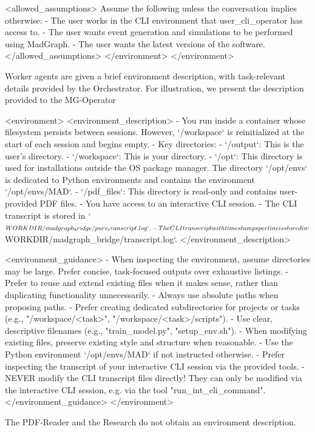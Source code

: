 \documentclass[submission, Phys]{SciPost}
\begin{document}
\begin{promptblocklit}
<allowed_assumptions>
Assume the following unless the conversation implies otherwise:
- The user works in the CLI environment that user_cli_operator has access to.
- The user wants event generation and simulations to be performed using MadGraph.
- The user wants the latest versions of the software.
</allowed_assumptions>
</environment>
</environment>
\end{promptblocklit}
%

Worker agents are given a brief environment description, with task-relevant details provided by the Orchestrator. For illustration, we present the description provided to the MG-Operator
\begin{promptblocklit}
<environment>
<environment_description>
- You run inside a container whose filesystem persists between sessions. However, `/workspace` is reinitialized at the start of each session and begins empty.
- Key directories:
  - `/output`: This is the user's directory.
  - `/workspace`: This is your directory.
  - `/opt`: This directory is used for installations outside the OS package manager. The directory `/opt/envs` is dedicated to Python environments and contains the environment `/opt/envs/MAD`.
  - `/pdf_files`: This directory is read-only and contains user-provided PDF files.
- You have access to an interactive CLI session.
  - The CLI transcript is stored in `$WORKDIR/madgraph_bridge/pure_transcript.log`.
  - The CLI transcript with timestamps per line is stored in `$WORKDIR/madgraph_bridge/transcript.log`.
</environment_description>

<environment_guidance>
- When inspecting the environment, assume directories may be large. Prefer concise, task-focused outputs over exhaustive listings.
- Prefer to reuse and extend existing files when it makes sense, rather than duplicating functionality unnecessarily.
- Always use absolute paths when proposing paths.
- Prefer creating dedicated subdirectories for projects or tasks (e.g., "/workspace/<task>", "/workspace/<task>/scripts").
- Use clear, descriptive filenames (e.g., "train_model.py", "setup_env.sh").
- When modifying existing files, preserve existing style and structure when reasonable.
- Use the Python environment `/opt/envs/MAD` if not instructed otherwise.
- Prefer inspecting the transcript of your interactive CLI session via the provided tools.
- NEVER modify the CLI transcript files directly! They can only be modified via the interactive CLI session, e.g. via the tool "run_int_cli_command".
</environment_guidance>
</environment>
\end{promptblocklit}
The PDF-Reader and the Research do not obtain an environment description.
\end{document}

